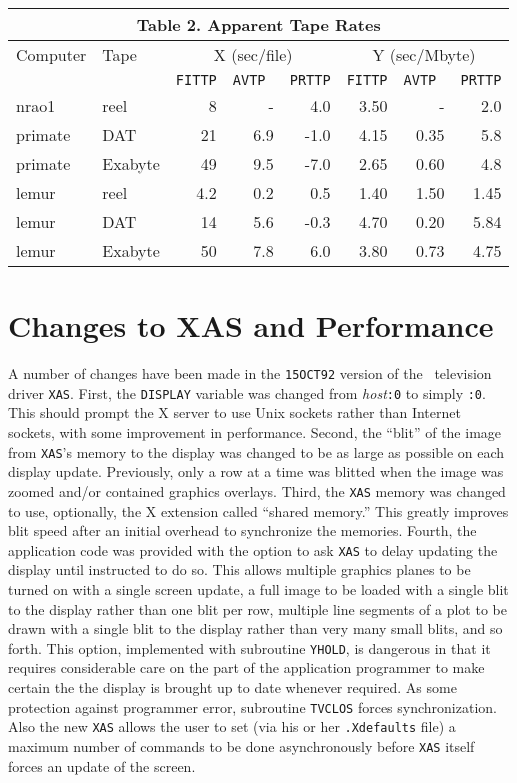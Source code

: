 \begin{center}
\begin{tabular}{ll|rrr|rrr}
\multicolumn{8}{c}{Table 2. \qquad Apparent Tape Rates \hfill}\\
\hline
Computer &Tape&\multicolumn{3}{c|}{X (sec/file)}&\multicolumn{3}{c}{Y (sec/Mbyte)}\\
 & &{\tt FITTP}&{\tt AVTP }&{\tt PRTTP}&{\tt FITTP}&{\tt AVTP }&{\tt PRTTP}\\
\hline
nrao1  &reel   &  8&   -& 4.0& 3.50&    -& 2.0\\
primate&DAT    & 21& 6.9&-1.0& 4.15& 0.35& 5.8\\
primate&Exabyte& 49& 9.5&-7.0& 2.65& 0.60& 4.8\\
lemur  &reel   &4.2& 0.2& 0.5& 1.40& 1.50& 1.45\\
lemur  &DAT    & 14& 5.6&-0.3& 4.70& 0.20& 5.84\\
lemur  &Exabyte& 50& 7.8& 6.0& 3.80& 0.73& 4.75\\
\hline
\end{tabular}
\end{center}

\section{Changes to XAS and Performance}

A number of changes have been made in the {\tt 15OCT92} version of the
\AIPS\ television driver \hbox{{\tt XAS}}.  First, the {\tt DISPLAY}
variable was changed from {\it host}{\tt :0} to simply {\tt :0}.  This
should prompt the X server to use Unix sockets rather than Internet
sockets, with some improvement in performance.  Second, the ``blit''
of the image from {\tt XAS}'s memory to the display was changed to be
as large as possible on each display update.  Previously, only a row
at a time was blitted when the image was zoomed and/or contained
graphics overlays.  Third, the {\tt XAS} memory was changed to use,
optionally, the X extension called ``shared memory.''  This greatly
improves blit speed after an initial overhead to synchronize the
memories.  Fourth, the application code was provided with the option
to ask {\tt XAS} to delay updating the display until instructed to do
so.  This allows multiple graphics planes to be turned on with a
single screen update, a full image to be loaded with a single blit to
the display rather than one blit per row, multiple line segments of a
plot to be drawn with a single blit to the display rather than very
many small blits, and so forth.  This option, implemented with
subroutine {\tt YHOLD}, is dangerous in that it requires considerable
care on the part of the application programmer to make certain the the
display is brought up to date whenever required.  As some protection
against programmer error, subroutine {\tt TVCLOS} forces
synchronization.  Also the new {\tt XAS} allows the user to set (via
his or her {\tt .Xdefaults} file) a maximum number of commands to be
done asynchronously before {\tt XAS} itself forces an update of the
screen.


